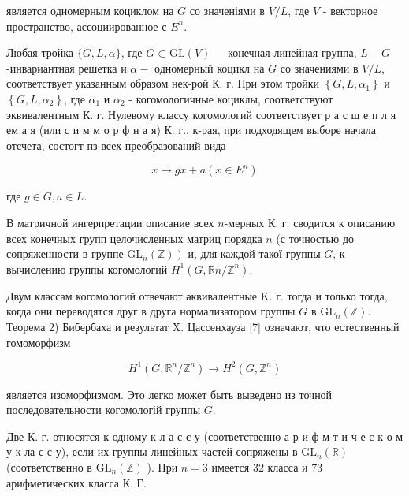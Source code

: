 \documentclass[10pt]{article}
\begin{document}
является одномерным коциклом на $G$ со значеніями в $V / L$, где $V$ - векторное пространство, ассоциированное с $E^{n}$.



Любая тройка $\{G, L, \alpha\}$, где $G \subset \mathrm{GL}(V)-$ конечная линейная группа, $L-G$-инвариантная решетка и $\alpha-$ одномерный коцикл на $G$ со значениями в $V / L$, соответствует указанным образом нек-рой К. г. При этом тройки $\left\{G, L, \alpha_{1}\right\}$ и $\left\{G, L, \alpha_{2}\right\}$, где $\alpha_{1}$ и $\alpha_{2}$ - когомологичные коциклы, соответствуют эквивалентным К. г. Нулевому классу когомологий соответствует р а с щ е п л я ем а я (или с и м м о р ф н а я) К. г., к-рая, при подходящем выборе начала отсчета, состогт пз всех преобразований вида



\[

x \longmapsto g x+a\left(x \in E^{n}\right)

\]



где $g \in G, a \in L$.



В матричной ингерпретации описание всех $n$-мерных К. г. сводится к описанию всех конечных групп целочисленных матриц порядка $n$ (с точностью до сопряженности в группе $\left.\mathrm{GL}_{n}(\mathbb{Z})\right)$ и, для каждой такої группы $G$, к вычислению группы когомологий $H^{1}\left(G, \mathbb{R} n / \mathbb{Z}^{n}\right)$.



Двум классам когомологий отвечают әквивалентные K. г. тогда и только тогда, когда они переводятся друг в друга нормализатором группы $G$ в $\mathrm{GL}_{n}(\mathbb{Z})$. Теорема 2) Бибербаха и результат X. Цассенхауза [7] означают, что естественный гомоморфизм



\[

H^{1}\left(G, \mathbb{R}^{n} / \mathbb{Z}^{n}\right) \longrightarrow H^{2}\left(G, \mathbb{Z}^{n}\right)

\]



является изоморфизмом. Это легко может быть выведено из точной последовательности когомологій группы $G$.



Две К. г. относятся к одному к л а с с у (соответственно а р и ф м т и ч е с к о м у к ла с с у), если их группы линейных частей сопряжены в $\mathrm{GL}_{n}(\mathbb{R})$ (соответственно в $\mathrm{GL}_{n}(\mathbb{Z})$ ). При $n=3$ имеется 32 класса и 73 арифметических класса К. Г.
\end{document}
